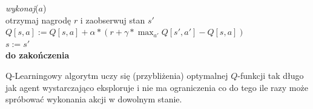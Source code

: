 \documentclass[a4paper, 12pt,oneside]{book}
\begin{document}
\begin{algorithm}
\begin{algorithmic}[1]
		\hspace{\algorithmicindent}
		\hspace{\algorithmicindent}\textit{wykonaj}($a$)\\
		\hspace{\algorithmicindent}
		\hspace{\algorithmicindent}otrzymaj nagrodę $r$ i
						zaobserwuj stan $s'$\\
		\hspace{\algorithmicindent}
		\hspace{\algorithmicindent}$Q[s,a] := Q[s,a] + \alpha *
		(r + \gamma * \max_{a'} Q[s',a'] - Q[s,a])$\\
		\hspace{\algorithmicindent}
		\hspace{\algorithmicindent} $s := s'$\\
		\hspace{\algorithmicindent}\textbf{do zakończenia}
	\EndProcedure
\end{algorithmic}
\label{qlearning_algorithm}
\end{algorithm}

Q-Learningowy algorytm uczy się (przybliżenia) optymalnej $Q$-funkcji tak długo
jak agent wystarczająco eksploruje i nie ma ograniczenia co do tego ile razy
może spróbować wykonania akcji w dowolnym stanie.
\end{document}
